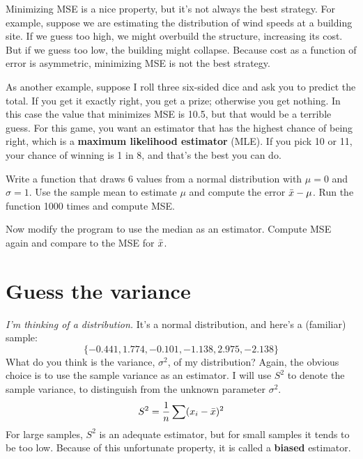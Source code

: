 \documentclass[12pt]{book}
\begin{document}
Minimizing MSE is a nice property, but it's not always the best
strategy.  For example, suppose we are estimating the distribution of
wind speeds at a building site.  If we guess too high, we might
overbuild the structure, increasing its cost.  But if we guess too
low, the building might collapse.  Because cost as a function of
error is asymmetric, minimizing MSE is not the best strategy.


As another example, suppose I roll three six-sided dice and ask you
to predict the total.  If you get it exactly right, you get a prize;
otherwise you get nothing.  In this case the value that minimizes MSE
is 10.5, but that would be a terrible guess.  For this game, you
want an estimator that has the highest chance of being right, which is
a {\bf maximum likelihood estimator} (MLE).  If you pick 10 or 11, your
chance of winning is 1 in 8, and that's the best you can do.


\begin{ex}


Write a function that draws 6 values from a normal distribution with
$\mu=0$ and $\sigma=1$.  Use the sample mean to estimate $\mu$ and
compute the error $\bar{x} - \mu$.  Run the function 1000 times and
compute MSE.

Now modify the program to use the median as an
estimator.  Compute MSE again and compare to the MSE for $\bar{x}$.


\end{ex}


\section{Guess the variance}


{\em I'm thinking of a distribution.}  It's a normal distribution, and 
here's a (familiar) sample:
%
\[ \{ -0.441, 1.774, -0.101, -1.138, 2.975, -2.138 \} \]
%
What do you think is the variance, $\sigma^2$, of my distribution?
Again, the obvious choice is to use the sample variance as an estimator.
I will use $S^2$ to denote the sample variance, to distinguish from the
unknown parameter $\sigma^2$.
%
\[ S^2 = \frac{1}{n} \sum (x_i - \bar{x})^2 \] 
%
For large samples, $S^2$ is an adequate estimator, but for small
samples it tends to be too low.  Because of this unfortunate
property, it is called a {\bf biased} estimator.
\end{document}
